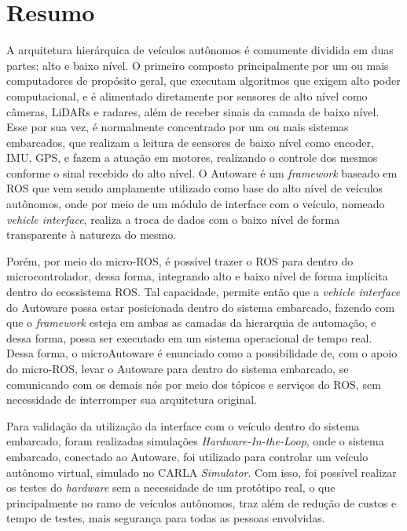 \section{Resumo}

A arquitetura hierárquica de veículos autônomos é comumente dividida em duas partes: alto e baixo nível. O primeiro composto principalmente por um ou mais computadores de propósito geral, que executam algoritmos que exigem alto poder computacional, e é alimentado diretamente por sensores de alto nível como câmeras, LiDARs e radares, além de receber sinais da camada de baixo nível. Esse por sua vez, é normalmente concentrado por um ou mais sistemas embarcados, que realizam a leitura de sensores de baixo nível como encoder, IMU, GPS, e fazem a atuação em motores, realizando o controle dos mesmos conforme o sinal recebido do alto nível. O Autoware é um \textit{framework} baseado em ROS que vem sendo amplamente utilizado como base do alto nível de veículos autônomos, onde por meio de um módulo de interface com o veículo, nomeado \textit{vehicle interface}, realiza a troca de dados com o baixo nível de forma transparente à natureza do mesmo. 

Porém, por meio do micro-ROS, é possível trazer o ROS para dentro do microcontrolador, dessa forma, integrando alto e baixo nível de forma implícita dentro do ecossistema ROS. Tal capacidade, permite então que a \textit{vehicle interface} do Autoware possa estar posicionada dentro do sistema embarcado, fazendo com que o \textit{framework} esteja em ambas as camadas da hierarquia de automação, e dessa forma, possa ser executado em um sistema operacional de tempo real. Dessa forma, o microAutoware é enunciado como a possibilidade de, com o apoio do micro-ROS, levar o Autoware para dentro do sistema embarcado, se comunicando com os demais nós por meio dos tópicos e serviços do ROS, sem necessidade de interromper sua arquitetura original.

Para validação da utilização da interface com o veículo dentro do sistema embarcado, foram realizadas simulações \textit{Hardware-In-the-Loop}, onde o sistema embarcado, conectado ao Autoware, foi utilizado para controlar um veículo autônomo virtual, simulado no CARLA \textit{Simulator}. Com isso, foi possível realizar os testes do \textit{hardware} sem a necessidade de um protótipo real, o que principalmente no ramo de veículos autônomos, traz além de redução de custos e tempo de testes, mais segurança para todas as pessoas envolvidas.


